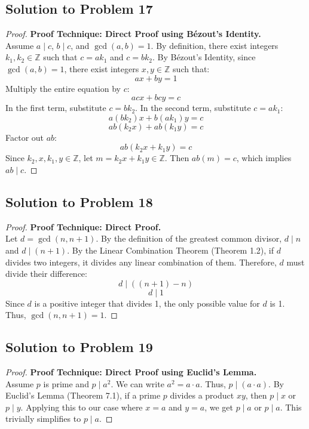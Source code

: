 \documentclass[12pt]{article}
\begin{document}
\subsection{Solution to Problem 17}
\begin{proof}
\textbf{Proof Technique: Direct Proof using B\'ezout's Identity.} \\
Assume $a \mid c$, $b \mid c$, and $\gcd(a, b) = 1$. By definition, there exist integers $k_1, k_2 \in \mathbb{Z}$ such that $c = ak_1$ and $c = bk_2$.
By B\'ezout's Identity, since $\gcd(a, b) = 1$, there exist integers $x, y \in \mathbb{Z}$ such that:
\[ ax + by = 1 \]
Multiply the entire equation by $c$:
\[ acx + bcy = c \]
In the first term, substitute $c = bk_2$. In the second term, substitute $c = ak_1$:
\[ a(bk_2)x + b(ak_1)y = c \]
\[ ab(k_2 x) + ab(k_1 y) = c \]
Factor out $ab$:
\[ ab(k_2 x + k_1 y) = c \]
Since $k_2, x, k_1, y \in \mathbb{Z}$, let $m = k_2 x + k_1 y \in \mathbb{Z}$. Then $ab(m) = c$, which implies $ab \mid c$.
\end{proof}

\subsection{Solution to Problem 18}
\begin{proof}
\textbf{Proof Technique: Direct Proof.} \\
Let $d = \gcd(n, n+1)$. By the definition of the greatest common divisor, $d \mid n$ and $d \mid (n+1)$.
By the Linear Combination Theorem (Theorem 1.2), if $d$ divides two integers, it divides any linear combination of them. Therefore, $d$ must divide their difference:
\[ d \mid ((n+1) - n) \]
\[ d \mid 1 \]
Since $d$ is a positive integer that divides 1, the only possible value for $d$ is 1. Thus, $\gcd(n, n+1) = 1$.
\end{proof}

\subsection{Solution to Problem 19}
\begin{proof}
\textbf{Proof Technique: Direct Proof using Euclid's Lemma.} \\
Assume $p$ is prime and $p \mid a^2$. We can write $a^2 = a \cdot a$. Thus, $p \mid (a \cdot a)$.
By Euclid's Lemma (Theorem 7.1), if a prime $p$ divides a product $xy$, then $p \mid x$ or $p \mid y$.
Applying this to our case where $x = a$ and $y = a$, we get $p \mid a$ or $p \mid a$. This trivially simplifies to $p \mid a$.
\end{proof}
\end{document}
